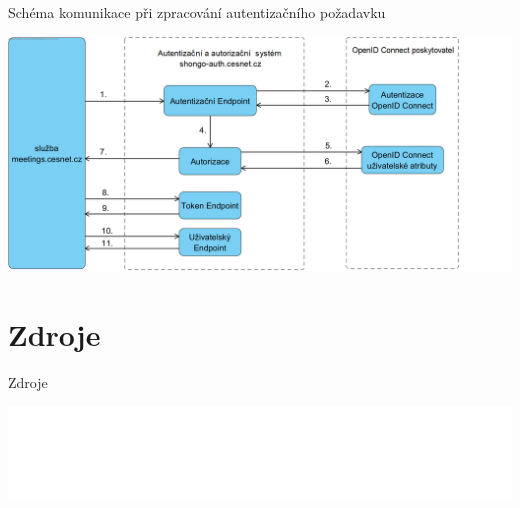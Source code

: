 \documentclass[
]{beamer}
\begin{document}
\begin{frame}{Schéma komunikace při zpracování autentizačního požadavku}

\includegraphics[width=\textwidth]{pics/meetings-oidc-obhajoba.png}
\end{frame}

\section[Zdroje]{Zdroje}

\begin{frame}[allowframebreaks]{Zdroje}


\end{frame}


\begingroup
{}
\begin{frame}[plain]
\vfill
\centering
\includegraphics[width=\textwidth]{institution}
\vfill
\end{frame}
\endgroup
\end{document}
